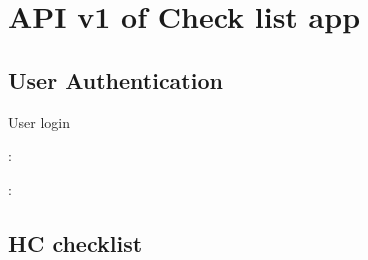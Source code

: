 \documentclass[letterpaper,10pt,english,openany,oneside]{sphinxmanual}
\begin{document}
\chapter{API v1 of Check list app}
\label{\detokenize{api-checklist/v1:api-v1-of-check-list-app}}\label{\detokenize{api-checklist/v1::doc}}

\section{User Authentication}
\label{\detokenize{api-checklist/v1:user-authentication}}

\begin{fulllineitems}
\label{\detokenize{api-checklist/v1:post--api-checklist-v1-Users-auth}}
\sphinxAtStartPar
User login

\sphinxAtStartPar
{}:

\begin{sphinxVerbatim}[commandchars=\\\{\}]
   
   
\end{sphinxVerbatim}

\sphinxAtStartPar
{}:

\begin{sphinxVerbatim}[commandchars=\\\{\}]
   
   
   
   
   
\end{sphinxVerbatim}

\end{fulllineitems}



\section{HC checklist}
\label{\detokenize{api-checklist/v1:hc-checklist}}
\end{document}
